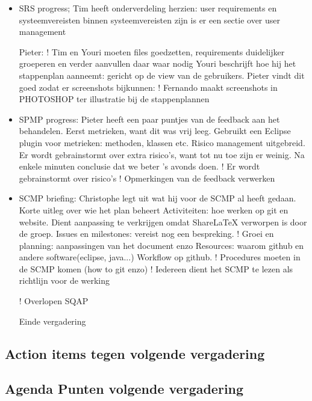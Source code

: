 \begin{itemize}
\item SRS progress;
Tim heeft onderverdeling herzien: user requirements en systeemvereisten
binnen systeemvereisten zijn is er een sectie over user management

Pieter: 
! Tim en Youri moeten files goedzetten, requirements duidelijker groeperen en verder aanvullen daar waar nodig 
Youri beschrijft hoe hij het stappenplan aanneemt: gericht op de view van de gebruikers.
Pieter vindt dit goed zodat er screenshots bijkunnen:
! Fernando maakt screenshots in PHOTOSHOP ter illustratie bij de stappenplannen

\item SPMP progress:
Pieter heeft een paar puntjes van de feedback aan het behandelen.
Eerst metrieken, want dit was vrij leeg.
Gebruikt een Eclipse plugin voor metrieken: methoden, klassen etc. 
Risico management uitgebreid. 
Er wordt gebrainstormt over extra risico's, want tot nu toe zijn er weinig. Na enkele minuten conclusie dat we beter 's avonds doen.
! Er wordt gebrainstormt over risico's
! Opmerkingen van de feedback verwerken

\item SCMP briefing:
Christophe legt uit wat hij voor de SCMP al heeft gedaan. 
Korte uitleg over wie het plan beheert 
Activiteiten: hoe werken op git en website. Dient aanpassing te verkrijgen omdat ShareLaTeX verworpen is door de groep.
Issues en milestones: vereist nog een bespreking.
! 
Groei en planning: aanpassingen van het document enzo
Resources: waarom github en andere software(eclipse, java...)
Workflow op github. 
! Procedures moeten in de SCMP komen (how to git enzo)
! Iedereen dient het SCMP te lezen als richtlijn voor de werking

! Overlopen SQAP

Einde vergadering


\end{itemize}
\subsection{Action items tegen volgende vergadering}
\subsection{Agenda Punten volgende vergadering}

